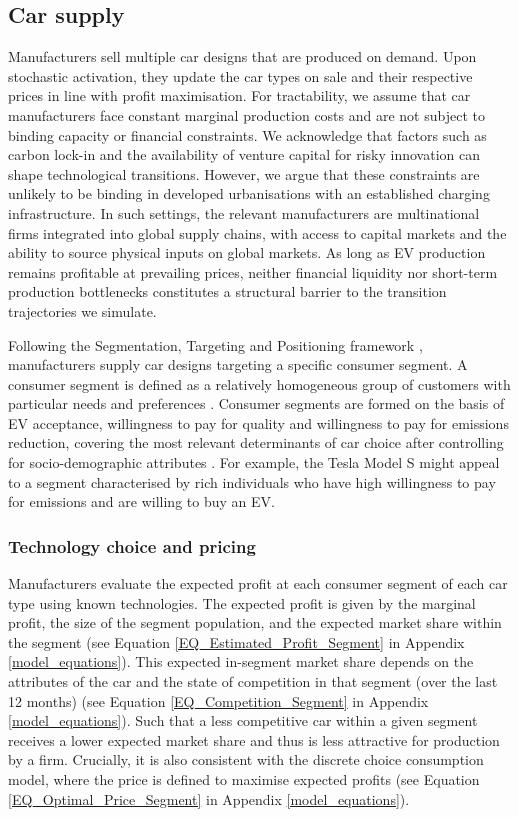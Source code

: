\documentclass[12pt]{article}
\begin{document}
	\subsection{Car supply}
	Manufacturers sell multiple car designs that are produced on demand. Upon stochastic activation, they update the car types on sale and their respective prices in line with profit maximisation. For tractability, we assume that car manufacturers face constant marginal production costs and are not subject to binding capacity or financial constraints. We acknowledge that factors such as carbon lock-in \citep{unruh2000understanding,unruh2002escaping} and the availability of venture capital for risky innovation \citep{mazzucato2013financing,mazzucato2017public} can shape technological transitions. However, we argue that these constraints are unlikely to be binding in developed urbanisations with an established charging infrastructure. In such settings, the relevant manufacturers are multinational firms integrated into global supply chains, with access to capital markets and the ability to source physical inputs on global markets. As long as EV production remains profitable at prevailing prices, neither financial liquidity nor short-term production bottlenecks constitutes a structural barrier to the transition trajectories we simulate.

	Following the Segmentation, Targeting and Positioning framework \citep{kotler1989mass}, manufacturers supply car designs targeting a specific consumer segment. A consumer segment is defined as a relatively homogeneous group of customers with particular needs and preferences \citep{lynn2012segmenting}. Consumer segments are formed on the basis of EV acceptance, willingness to pay for quality and willingness to pay for emissions reduction, covering the most relevant determinants of car choice after controlling for socio-demographic attributes \citep{axsen2013vehicles,keyes2018vehicles,jang2021vehicles}. For example, the Tesla Model S might appeal to a segment characterised by rich individuals who have high willingness to pay for emissions and are willing to buy an EV.

	\subsubsection{Technology choice and pricing}\label{Supply:Choice_Pricing}
	Manufacturers evaluate the expected profit at each consumer segment of each car type using known technologies. The expected profit is given by the marginal profit, the size of the segment population, and the expected market share within the segment (see Equation \ref{EQ_Estimated_Profit_Segment} in Appendix \ref{model_equations}). This expected in-segment market share depends on the attributes of the car and the state of competition in that segment (over the last 12 months) (see Equation \ref{EQ_Competition_Segment} in Appendix \ref{model_equations}). Such that a less competitive car within a given segment receives a lower expected market share and thus is less attractive for production by a firm. Crucially, it is also consistent with the discrete choice consumption model, where the price is defined to maximise expected profits (see Equation \ref{EQ_Optimal_Price_Segment} in Appendix \ref{model_equations}).
\end{document}
